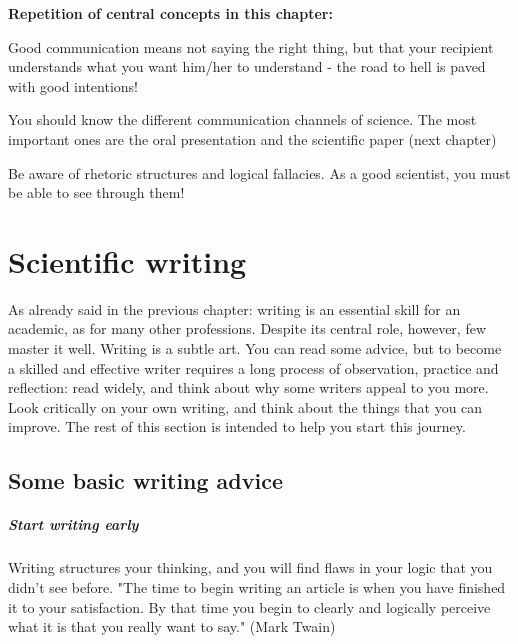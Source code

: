 \documentclass{tufte-book}
\begin{document}
\vspace{1cm}
\begin{mdframed}
    
\textbf{Repetition of central concepts in this chapter:} 

\begin{itemize*}
  \item Good communication means not saying the right thing, but that your recipient understands what you want him/her to understand - the road to hell is paved with good intentions!
  \item You should know the different communication channels of science. The most important ones are the oral presentation and the scientific paper (next chapter)
  \item Be aware of rhetoric structures and logical fallacies. As a good scientist, you must be able to see through them!
\end{itemize*}

\end{mdframed}



\chapter{Scientific writing}

As already said in the previous chapter: writing is an essential skill for an academic, as for many other professions.  Despite its central role, however, few master it well. Writing is a subtle art. You can read some advice, but to become a skilled and effective writer requires a long process of observation, practice and reflection: read widely, and think about why some writers appeal to you more. Look critically on your own writing, and think about the things that you can improve. The rest of this section is intended to help you start this journey. 

\section{Some basic writing advice}

\paragraph{Start writing early}Writing structures your thinking, and you will find flaws in your logic that you didn't see before. "The time to begin writing an article is when you have finished it to your satisfaction. By that time you begin to clearly and logically perceive what it is that you really want to say." (Mark Twain)
\end{document}

